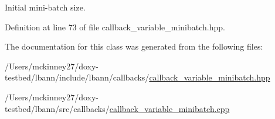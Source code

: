 Initial mini-\/batch size. 



Definition at line 73 of file callback\+\_\+variable\+\_\+minibatch.\+hpp.



The documentation for this class was generated from the following files\+:\begin{DoxyCompactItemize}
\item 
/\+Users/mckinney27/doxy-\/testbed/lbann/include/lbann/callbacks/\hyperlink{callback__variable__minibatch_8hpp}{callback\+\_\+variable\+\_\+minibatch.\+hpp}\item 
/\+Users/mckinney27/doxy-\/testbed/lbann/src/callbacks/\hyperlink{callback__variable__minibatch_8cpp}{callback\+\_\+variable\+\_\+minibatch.\+cpp}\end{DoxyCompactItemize}
